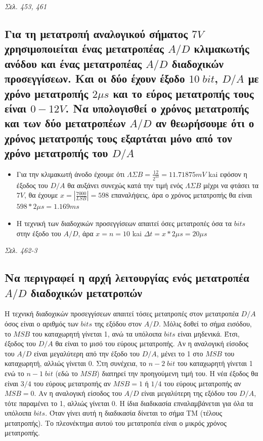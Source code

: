 \documentclass{article}
\begin{document}
\emph{Σελ. 453, 461}

\subsection{Για τη μετατροπή αναλογικού σήματος $7V$ χρησιμοποιείται ένας μετατροπέας $A/D$ κλιμακωτής ανόδου και ένας μετατροπέας $Α/D$ διαδοχικών προσεγγίσεων. Και οι δύο έχουν έξοδο 
$10\; bit$, $D/A$ με χρόνο μετατροπής $2\mu s$ και το εύρος μετατροπής τους είναι $0-12V$. Να υπολογισθεί ο χρόνος μετατροπής και των δύο μετατροπέων $A/D$ αν θεωρήσουμε ότι ο χρόνος
μετατροπής τους εξαρτάται μόνο από τον χρόνο μετατροπής του $D/A$}
    
\begin{itemize}
    \item Για την κλιμακωτή άνοδο έχουμε ότι $ΛΣΒ = \frac{12}{2^{10}} = 11.71875mV$ kai εφόσον η έξοδος του $D/A$ θα αυξάνει συνεχώς κατά την τιμή ενός $ΛΣΒ$ μέχρι να φτάσει τα $7V$, 
        θα έχουμε $x = |\frac{7000}{LSB}| = 598$ επαναλήψεις, άρα ο χρόνος μετατροπής θα είναι $598*2\mu s = 1.169ms$
    \item Η τεχνική των διαδοχικών προσεγγίσεων απαιτεί όσες μετατροπές όσα τα $bits$ στην έξοδο του $A/D$, άρα $x = n = 10$ kai $\Delta t = x * 2\mu s = 20\mu s$
\end{itemize}
\emph{Σελ. 462-3}

\subsection{Να περιγραφεί η αρχή λειτουργίας ενός μετατροπέα $Α/D$ διαδοχικών μετατροπών}
Η τεχνική διαδοχικών προσεγγίσεων απαιτεί τόσες μετατροπές στον μετατροπέα $D/A$ όσος είναι ο αριθμός των $bits$ της εξόδου στον $A/D$. Μόλις δοθεί το σήμα εισόδου, το 
$MSB$ του καταχωρητή γίνεται 1, ανώ τα υπόλοιπα $bits$ είναι μηδενικά. Έτσι, έξοδος του $D/A$ θα είναι το μισό του εύρους μετατροπής. Αν η αναλογική είσοδος του $A/D$ 
είναι μεγαλύτερη από την έξοδο του $D/A$, μένει το 1 στο $MSB$ του καταχωρητή, αλλιώς γίνεται 0. Στη συνέχεια, το $n-2\;bit$ του καταχωρητή γίνεται 1 ενώ το $n-1\;bit$ (εδώ το $MSB$)
διατηρεί την προηγούμενη τιμή του. Η νέα έξοδος θα είναι $3/4$ του εύρους μετατροπής αν $MSB=1$ ή $1/4$ του εύρους μετατροπής αν $MSB=0$. Αν η αναλογική είσοδος του
$A/D$ είναι μεγαλύτερη της εξόδου του $D/A$, τότε παραμένει το 1, αλλιώς γίνεται 0. Η ίδια διαδικασία επναλαμβάνεται για όλα τα υπόλοιπα $bits$. Όταν γίνει αυτή η διαδικασία 
δίνεται το σήμα ΤΜ (τέλους μετατροπής). Το πλεονέκτημα αυτού του μετατροπέα είναι ο μικρός χρόνος μετατροπής.
\end{document}
